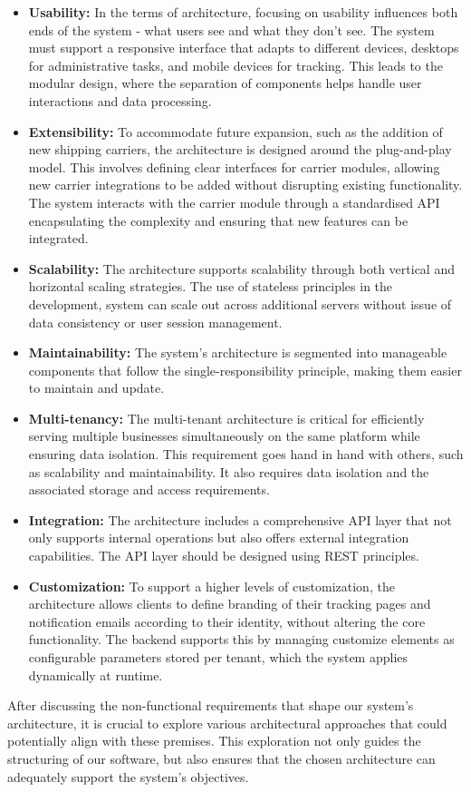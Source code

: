 \begin{itemize}
    \item \textbf{Usability:} In the terms of architecture, focusing on usability influences both ends of the system - what users see and what they don't see.
    The system must support a responsive interface that adapts to different devices, desktops for administrative tasks, and mobile devices for tracking.
    This leads to the modular design, where the separation of components helps handle user interactions and data processing.
    \item \textbf{Extensibility:} To accommodate future expansion, such as the addition of new shipping carriers, the architecture is designed around the plug-and-play model.
    This involves defining clear interfaces for carrier modules, allowing new carrier integrations to be added without disrupting existing functionality.
    The system interacts with the carrier module through a standardised API encapsulating the complexity and ensuring that new features can be integrated.
    \item \textbf{Scalability:} The architecture supports scalability through both vertical and horizontal scaling strategies.
    The use of stateless principles in the development, system can scale out across additional servers without issue of data consistency or user session management.
    \item \textbf{Maintainability:} The system's architecture is segmented into manageable components that follow the single-responsibility principle, making them easier to maintain and update.
    \item \textbf{Multi-tenancy:} The multi-tenant architecture is critical for efficiently serving multiple businesses simultaneously on the same platform while ensuring data isolation.
    This requirement goes hand in hand with others, such as scalability and maintainability. It also requires data isolation and the associated storage and access requirements.
    \item \textbf{Integration:} The architecture includes a comprehensive API layer that not only supports internal operations but also offers external integration capabilities.
    The API layer should be designed using REST principles.
    \item \textbf{Customization:} To support a higher levels of customization, the architecture allows clients to define branding of their tracking pages and notification emails according to their identity, without altering the core functionality.
    The backend supports this by managing customize elements as configurable parameters stored per tenant, which the system applies dynamically at runtime.
\end{itemize}
After discussing the non-functional requirements that shape our system's architecture, it is crucial to explore various architectural approaches that could potentially align with these premises.
This exploration not only guides the structuring of our software, but also ensures that the chosen architecture can adequately support the system's objectives.


